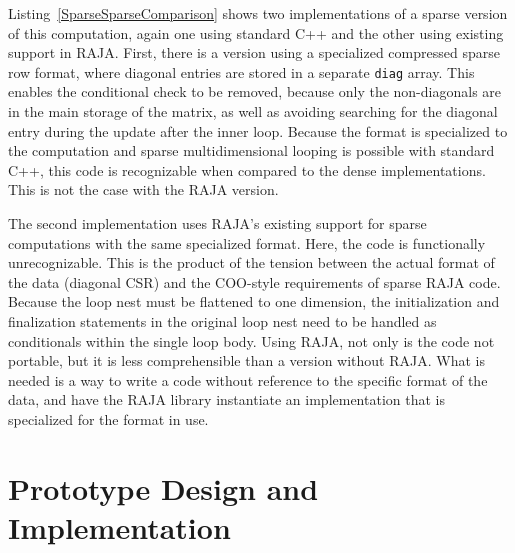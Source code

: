 Listing~\ref{SparseSparseComparison} shows two implementations of a sparse version of this computation, again one using standard C++ and the other using existing support in RAJA\@.
First, there is a version using a specialized compressed sparse row format, where diagonal entries are stored in a separate \verb.diag. array.
This enables the conditional check to be removed, because only the non-diagonals are in the main storage of the matrix, as well as avoiding searching for the diagonal entry during the update after the inner loop.
Because the format is specialized to the computation and sparse multidimensional looping is possible with standard C++, this code is recognizable when compared to the dense implementations.
This is not the case with the RAJA version.

The second implementation uses RAJA's existing support for sparse computations with the same specialized format.
Here, the code is functionally unrecognizable.
This is the product of the tension between the actual format of the data (diagonal CSR) and the COO-style requirements of sparse RAJA code.
Because the loop nest must be flattened to one dimension, the initialization and finalization statements in the original loop nest need to be handled as conditionals within the single loop body.
Using RAJA, not only is the code not portable, but it is less comprehensible than a version without RAJA\@.
What is needed is a way to write a code without reference to the specific format of the data, and have the RAJA library instantiate an implementation that is specialized for the format in use.

\section{Prototype Design and Implementation}\label{sec:SparseRAJA}


